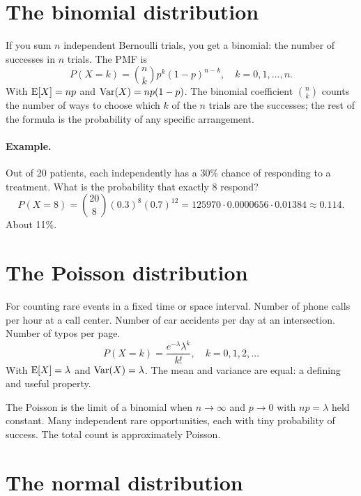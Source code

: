 \section{The binomial distribution}

If you sum $n$ independent Bernoulli trials, you get a binomial: the number of successes in $n$ trials. The PMF is
\begin{equation}
  P(X = k) = \binom{n}{k} p^k (1-p)^{n-k}, \quad k = 0, 1, \ldots, n.
  \label{eq:binomial-pmf}
\end{equation}
With $\operatorname{E}[X] = np$ and $\operatorname{Var}(X) = np(1-p)$. The binomial coefficient $\binom{n}{k}$ counts the number of ways to choose which $k$ of the $n$ trials are the successes; the rest of the formula is the probability of any specific arrangement.

\paragraph{Example.} Out of 20 patients, each independently has a 30\% chance of responding to a treatment. What is the probability that exactly 8 respond?
\[
  P(X = 8) = \binom{20}{8}(0.3)^8(0.7)^{12} = 125970 \cdot 0.0000656 \cdot 0.01384 \approx 0.114.
\]
About 11\%.

\section{The Poisson distribution}

For counting rare events in a fixed time or space interval. Number of phone calls per hour at a call center. Number of car accidents per day at an intersection. Number of typos per page.
\begin{equation}
  P(X = k) = \frac{e^{-\lambda} \lambda^k}{k!}, \quad k = 0, 1, 2, \ldots
  \label{eq:poisson-pmf}
\end{equation}
With $\operatorname{E}[X] = \lambda$ and $\operatorname{Var}(X) = \lambda$. The mean and variance are equal: a defining and useful property.

The Poisson is the limit of a binomial when $n \to \infty$ and $p \to 0$ with $np = \lambda$ held constant. Many independent rare opportunities, each with tiny probability of success. The total count is approximately Poisson.

\section{The normal distribution}

